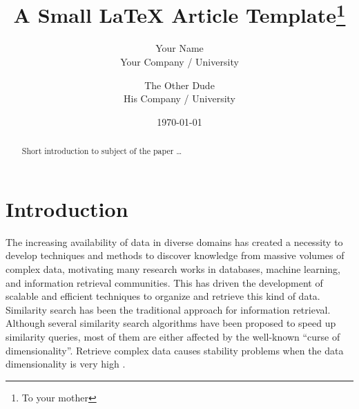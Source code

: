 \documentclass{article}
\title{A Small \LaTeX{} Article Template\thanks{To your mother}}
\author{Your Name  \\
	Your Company / University  \\
	\and
	The Other Dude \\
	His Company / University \\
	}
\date{\today}
\begin{document}
\maketitle


\begin{abstract}
Short introduction to subject of the paper \ldots
\end{abstract}





\section{Introduction}\label{sec:intro}

The increasing availability of data in diverse domains has created a necessity to develop techniques and methods to discover knowledge from massive volumes of complex data, motivating many research works in databases, machine learning, and information retrieval communities.  This has driven the development of scalable and efficient techniques to organize and retrieve this kind of data. Similarity search has been the traditional approach for information retrieval.  Although several similarity search algorithms have been proposed to speed up similarity queries, most of them are either affected by the well-known ``curse of dimensionality''.  Retrieve  complex data causes   stability problems  when the data dimensionality is very high \cite{aleman_high_dimensional}.  %


\end{document}
